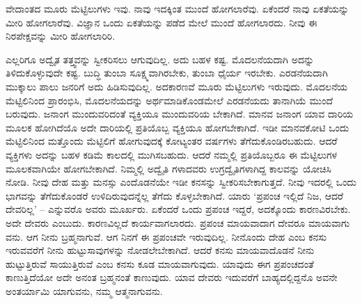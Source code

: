 ವೇದಾಂತದ ಮೂರು ಮೆಟ್ಟಿಲುಗಳು ಇವು. ನಾವು ಇದಕ್ಕಿಂತ ಮುಂದೆ ಹೋಗಲಾರೆವು. ಏಕೆಂದರೆ ನಾವು ಏಕತೆಯನ್ನು ಮೀರಿ ಹೋಗಲಾರೆವು. ವಿಜ್ಞಾನ ಒಂದು ಏಕತೆಯನ್ನು ಪಡೆದ ಮೇಲೆ ಮುಂದೆ ಹೋಗಲಾರದು. ನೀವು ಈ ನಿರಪೇಕ್ಷವನ್ನು ಮೀರಿ ಹೋಗಲಾರಿರಿ.

ಎಲ್ಲರಿಗೂ ಅದ್ವೈತ ತತ್ತ್ವವನ್ನು ಸ್ವೀಕರಿಸಲು ಆಗುವುದಿಲ್ಲ. ಅದು ಬಹಳ ಕಷ್ಟ. ಮೊದಲನೆಯದಾಗಿ ಅದನ್ನು ತಿಳಿದುಕೊಳ್ಳುವುದೇ ಕಷ್ಟ. ಬುದ್ಧಿ ತುಂಬಾ ಸೂಕ್ಷ್ಮವಾಗಿರಬೇಕು, ತುಂಬಾ ಧೈರ್ಯ ಇರಬೇಕು. ಎರಡನೆಯದಾಗಿ ಮುಕ್ಕಾಲು ಪಾಲು ಜನರಿಗೆ ಅದು ಹಿಡಿಸುವುದಿಲ್ಲ. ಅದಕಾರಣವೆ ಮೂರು ಮೆಟ್ಟಿಲುಗಳು ಇರುವುದು. ಮೊದಲನೆಯ ಮೆಟ್ಟಿಲಿನಿಂದ ಪ್ರಾರಂಭಿಸಿ, ಮೊದಲನೆಯದನ್ನು ಅರ್ಥಮಾಡಿಕೊಂಡಮೇಲೆ ಎರಡನೆಯದು ತಾನಾಗಿಯೆ ಮುಂದೆ ಬರುವುದು. ಜನಾಂಗ ಮುಂದುವರಿದಂತೆ ವ್ಯಕ್ತಿಯೂ ಮುಂದುವರಿಯ ಬೇಕಾಗಿದೆ. ಮಾನವ ಜನಾಂಗ ಯಾವ ದಾರಿಯ ಮೂಲಕ ಹೋಗಿದೆಯೊ ಅದೇ ದಾರಿಯಲ್ಲಿ ಪ್ರತಿಯೊಬ್ಬ ವ್ಯಕ್ತಿಯೂ ಹೋಗಬೇಕಾಗಿದೆ. ಇಡೀ ಮಾನವಕೋಟಿ ಒಂದು ಮೆಟ್ಟಿಲಿನಿಂದ ಮತ್ತೊಂದು ಮೆಟ್ಟಿಲಿಗೆ ಹೋಗುವುದಕ್ಕೆ ಕೋಟ್ಯಂತರ ವರ್ಷಗಳು ತೆಗೆದುಕೊಂಡಿರಬಹುದು. ಆದರೆ ವ್ಯಕ್ತಿಗಳು ಅದನ್ನು ಬಹಳ ಕಡಿಮೆ ಕಾಲದಲ್ಲಿ ಮುಗಿಸಬಹುದು. ಆದರೆ ನಮ್ಮಲ್ಲಿ ಪ್ರತಿಯೊಬ್ಬರೂ ಈ ಮೆಟ್ಟಿಲುಗಳ ಮೂಲಕವಾಗಿಯೇ ಹೋಗಬೇಕಾಗಿದೆ. ನಿಮ್ಮಲ್ಲಿ ಅದ್ವೈತಿ ಗಳಾದವರು ಉಗ್ರದ್ವೈತಿಗಳಾಗಿದ್ದ ಕಾಲವನ್ನು ಯೋಚಿಸಿ ನೋಡಿ. ನೀವು ದೇಹ ಮತ್ತು ಮನಸ್ಸು ಎಂದೊಡನೆಯೇ ಇಡೀ ಕನಸನ್ನು ಸ್ವೀಕರಿಸಬೇಕಾಗುತ್ತದೆ. ನೀವು ಇದರಲ್ಲಿ ಒಂದು ಭಾಗವನ್ನು ತೆಗೆದುಕೊಂಡರೆ ಉಳಿದಿರುವುದನ್ನೆಲ್ಲ ತೆಗೆದು ಕೊಳ್ಳಬೇಕಾಗಿದೆ. ಯಾರು ‘ಪ್ರಪಂಚ ಇಲ್ಲಿದೆ ನಿಜ, ಆದರೆ ದೇವರಿಲ್ಲ’ – ಎನ್ನುವರೊ ಅವರು ಮೂರ್ಖರು. ಏಕೆಂದರೆ ಒಂದು ಪ್ರಪಂಚ ಇದ್ದರೆ, ಅದಕ್ಕೊಂದು ಕಾರಣವಿರಬೇಕು. ಅದೇ ದೇವರು ಎಂಬುದು. ಕಾರಣವಿಲ್ಲದೆ ಕಾರ್ಯವಾಗಲಾರದು. ಪ್ರಪಂಚ ಮಾಯವಾದಾಗ ದೇವರೂ ಮಾಯವಾಗು ವನು. ಆಗ ನೀನು ಬ್ರಹ್ಮನಾಗುವೆ. ಆಗ ನಿನಗೆ ಈ ಪ್ರಪಂಚವೇ ಇರುವುದಿಲ್ಲ. ನೀನೊಂದು ದೇಹ ಎಂಬ ಕನಸು ಇರುವವರೆಗೆ ನೀನು ಹುಟ್ಟುಸಾವುಗಳನ್ನು ನೋಡಲೇಬೇಕಾಗಿದೆ. ಆದರೆ ಕನಸು ಮಾಯವಾದೊಡನೆ ನೀನು ಹುಟ್ಟುತ್ತಿರುವೆ ಸಾಯುತ್ತಿರುವೆ ಎಂಬ ಕನಸು ಕೂಡ ಮಾಯವಾಗುವುದು. ಯಾವುದು ಈಗ ಪ್ರಪಂಚದಂತೆ ಕಾಣುತ್ತಿದೆಯೋ ಅದೇ ಅನಂತ ಬ್ರಹ್ಮನಂತೆ ಕಾಣುವುದು. ಯಾವ ದೇವರು ಇದುವರೆಗೆ ಬಾಹ್ಯದಲ್ಲಿದ್ದನೊ ಅವನೇ ಅಂತರ್ಯಾಮಿ ಯಾಗುವನು, ನಮ್ಮ ಆತ್ಮನಾಗುವನು.

